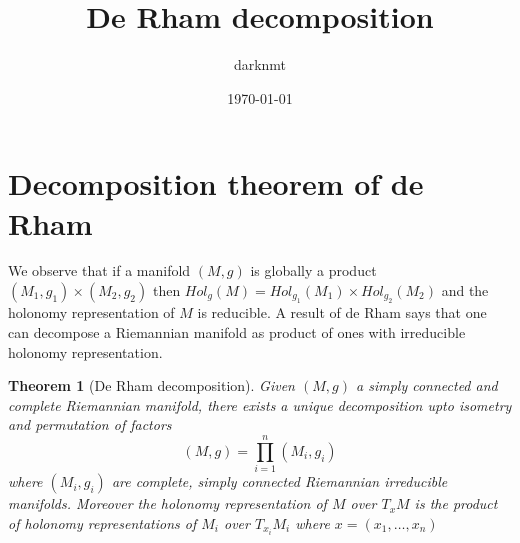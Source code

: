 \documentclass[11pt]{article}
\author{darknmt}
\date{\today}
\title{De Rham decomposition}
\newtheorem{theorem}{Theorem}
\begin{document}
\maketitle
\tableofcontents


\section{Decomposition theorem of de Rham}
\label{sec:org1c44441}

We observe that if a manifold \((M,g)\) is globally a product \((M_1,g_1)\times (M_2,g_2)\) then
\(Hol_{g}(M) = Hol_{g_1}(M_1)\times Hol_{g_2}(M_2)\) and the holonomy representation of \(M\) is
reducible. A result of de Rham says that one can decompose a Riemannian manifold as product of ones
with irreducible holonomy representation.


\begin{theorem}[De Rham decomposition]
\label{org889e5be}
Given \((M,g)\) a simply connected and complete Riemannian manifold, there exists a unique
decomposition upto isometry and permutation of factors
\[
(M,g) = \prod_{i=1}^n(M_i,g_i)
\]
where \((M_i,g_i)\) are complete, simply connected Riemannian irreducible manifolds. Moreover the
holonomy representation of \(M\) over \(T_xM\) is the product of holonomy representations of \(M_i\) over
\(T_{x_i}M_i\) where \(x = (x_1,\dots, x_n)\)
\end{theorem}
\end{document}
